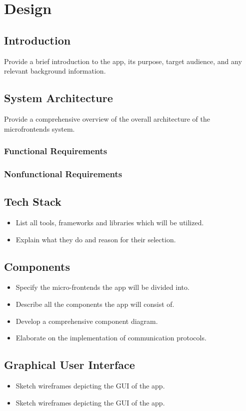 \chapter{Design}
\label{chap:Design}

\section{Introduction}
Provide a brief introduction to the app, its purpose, target audience, and any relevant background information.

\section{System Architecture}
Provide a comprehensive overview of the overall architecture of the microfrontends system. 
\subsection{Functional Requirements}
\subsection{Nonfunctional Requirements}

\section{Tech Stack}
\begin{itemize}
   \item List all tools, frameworks and libraries which will be utilized.
   \item Explain what they do and reason for their selection.
\end{itemize} 

\section{Components}
\begin{itemize}
   \item Specify the micro-frontends the app will be divided into.
   \item Describe all the components the app will consist of.
   \item Develop a comprehensive component diagram.
   \item Elaborate on the implementation of communication protocols.
\end{itemize}

\section{Graphical User Interface}
\begin{itemize}
   \item Sketch wireframes depicting the GUI of the app.
   \item Sketch wireframes depicting the GUI of the app.
\end{itemize}
